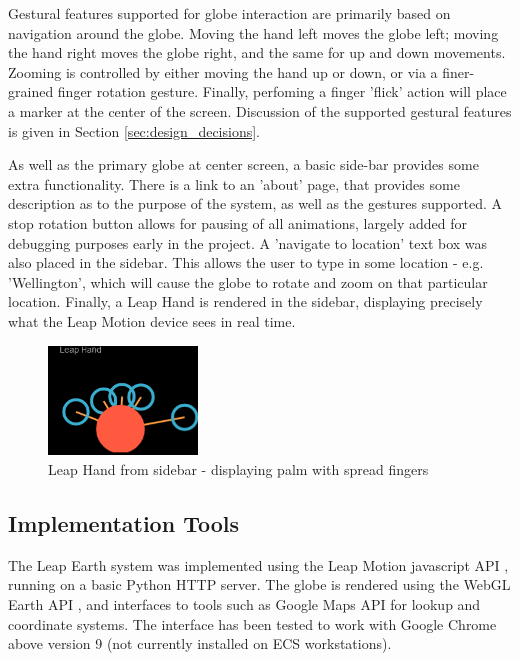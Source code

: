\documentclass{sigplanconf}
\begin{document}
Gestural features supported for globe interaction are primarily based on navigation around the globe. Moving the hand left moves the globe left; moving the hand right moves the globe right, and the same for up and down movements. Zooming is controlled by either moving the hand up or down, or via a finer-grained finger rotation gesture. Finally, perfoming a finger 'flick' action will place a marker at the center of the screen. Discussion of the supported gestural features is given in Section \ref{sec:design_decisions}.

As well as the primary globe at center screen, a basic side-bar provides some extra functionality. There is a link to an 'about' page, that provides some description as to the purpose of the system, as well as the gestures supported. A stop rotation button allows for pausing of all animations, largely added for debugging purposes early in the project. A 'navigate to location' text box was also placed in the sidebar. This allows the user to type in some location - e.g. 'Wellington', which will cause the globe to rotate and zoom on that particular location. Finally, a Leap Hand is rendered in the sidebar, displaying precisely what the Leap Motion device sees in real time. 

\begin{center}
\begin{figure}[h!]
\centering
\includegraphics[width=150px]{images/palm_spread_zoom.png}
\caption{Leap Hand from sidebar - displaying palm with spread fingers}
\label{fig:halo_comparison}
\vspace{-10pt}
\end{figure}
\end{center}

\subsection{Implementation Tools}

The Leap Earth system was implemented using the Leap Motion javascript API \cite{}, running on a basic Python HTTP server. The globe is rendered using the WebGL Earth API \cite{}, and interfaces to tools such as Google Maps API for lookup and coordinate systems. The interface has been tested to work with Google Chrome above version 9 (not currently installed on ECS workstations).
\end{document}
